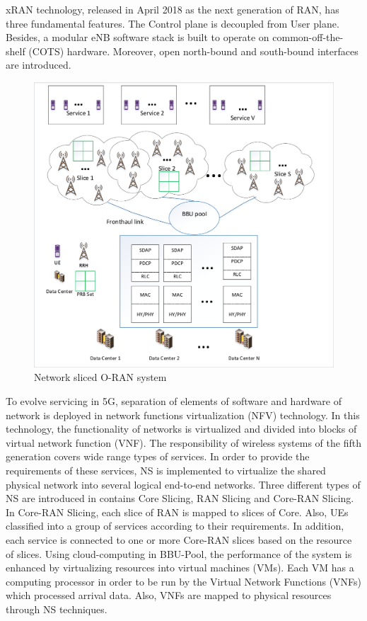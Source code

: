 \documentclass[conference]{IEEEtran}
\begin{document}
xRAN technology, released in April 2018 as the next generation of RAN, has three fundamental features. The Control plane is decoupled from User plane. Besides, a modular eNB software stack is built to operate on common-off-the-shelf (COTS) hardware. Moreover, open north-bound and south-bound interfaces are introduced\cite{xran}.
\begin{figure}[H]
  \centering
    \includegraphics[scale=0.55]{c4}
  \caption{Network sliced O-RAN system}
  \label{fig:c11}
\end{figure} 
To evolve servicing in 5G, separation of elements of software and hardware of network is deployed in network functions virtualization (NFV) technology. In this technology, the functionality of networks is virtualized and divided into blocks of virtual network function (VNF).
The responsibility of wireless systems of the fifth generation covers wide range types of services. In order to provide the requirements of these services, NS is implemented to virtualize the shared physical network into several logical end-to-end networks. Three different types of NS are introduced in \cite{ns1} contains Core Slicing, RAN Slicing and Core-RAN Slicing. In Core-RAN Slicing, each slice of RAN is mapped to slices of Core. Also, UEs classified into a group of services according to their requirements. In addition, each service is connected to one or more Core-RAN slices based on the resource of slices.
Using cloud-computing in BBU-Pool, the performance of the system is enhanced by virtualizing resources
into virtual machines (VMs).
Each VM has a computing processor in order to be run by the Virtual Network Functions (VNFs) which processed arrival data. Also, VNFs are mapped to physical resources through NS techniques\cite{frdl,luong2018novel,luong2018novel1}. 
\end{document}
